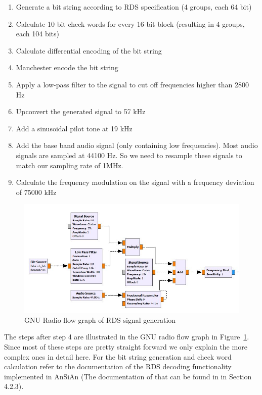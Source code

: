 \begin{enumerate}
	\item Generate a bit string according to RDS specification (4 groups, each 64 bit)
	\item Calculate 10 bit check words for every 16-bit block (resulting in 4 groups, each 104 bits)
	\item Calculate differential encoding of the bit string
	\item Manchester encode the bit string
	\item Apply a low-pass filter to the signal to cut off frequencies higher than 2800 Hz
	\item Upconvert the generated signal to 57 kHz
	\item Add a sinusoidal pilot tone at 19 kHz
	\item Add the base band audio signal (only containing low frequencies). Most audio signals are sampled at 44100 Hz. So we need to resample these signals to match our sampling rate of 1MHz. 
	\item Calculate the frequency modulation on the signal with a frequency deviation of 75000 kHz 	
\end{enumerate}

\begin{figure}
	\centering
	\includegraphics[width=1.0\linewidth]{gfx/rds_gnu.jpg}
	\caption{GNU Radio flow graph of RDS signal generation}
	\label{fig:impl:rdsgnu}
\end{figure}

The steps after step 4 are illustrated in the GNU radio flow graph in Figure~\ref{fig:impl:rdsgnu}. Since most of these steps are pretty straight forward we only explain the more complex ones in detail here. For the bit string generation and check word calculation refer to the documentation of the RDS decoding functionality implemented in AnSiAn (The documentation of that can be found in \cite{Mantz2016} in Section 4.2.3). 

